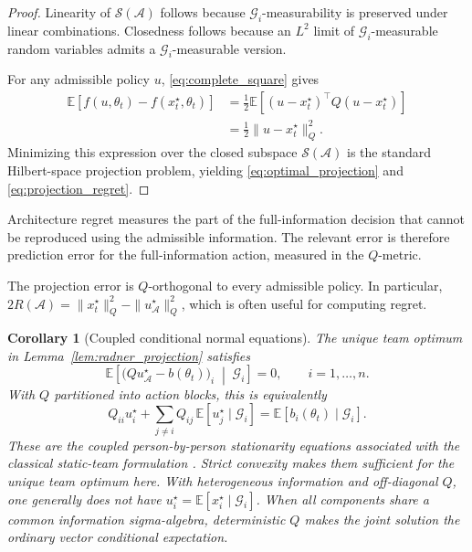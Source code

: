 \documentclass[11pt]{article}
\newtheorem{corollary}{Corollary}
\begin{document}
\begin{proof}
Linearity of $\mathcal{S}(\mathcal{A})$ follows because
$\mathcal{G}_i$-measurability is preserved under linear combinations.
Closedness follows because an $L^2$ limit of
$\mathcal{G}_i$-measurable random variables admits a
$\mathcal{G}_i$-measurable version.

For any admissible policy $u$, \eqref{eq:complete_square} gives
\begin{align}
    \mathbb{E}
    \left[
        f(u,\theta_t)
        -
        f(x_t^\star,\theta_t)
    \right]
    &=
    \frac{1}{2}
    \mathbb{E}
    \left[
        (u-x_t^\star)^\top
        Q
        (u-x_t^\star)
    \right]
    \nonumber\\
    &=
    \frac{1}{2}
    \|u-x_t^\star\|_Q^2.
    \label{eq:projection_proof}
\end{align}
Minimizing this expression over the closed subspace
$\mathcal{S}(\mathcal{A})$ is the standard Hilbert-space projection problem,
yielding \eqref{eq:optimal_projection} and \eqref{eq:projection_regret}.
\end{proof}

Architecture regret measures the part of the full-information decision that
cannot be reproduced using the admissible information. The relevant error is
therefore prediction error for the full-information action, measured in the
$Q$-metric.

The projection error is $Q$-orthogonal to every admissible policy. In particular,
$2R(\mathcal A)=\|x_t^\star\|_Q^2-\|u_{\mathcal A}^\star\|_Q^2$,
which is often useful for computing regret.

\begin{corollary}[Coupled conditional normal equations]
\label{cor:conditional_normal_equations}
The unique team optimum in Lemma~\ref{lem:radner_projection} satisfies
\begin{equation}
    \boxed{
    \mathbb E\!\left[
      \bigl(Q u_{\mathcal A}^{\star}-b(\theta_t)\bigr)_i
      \;\middle|\;
      \mathcal G_i
    \right]
    =0,
    \qquad i=1,\ldots,n.
    }
    \label{eq:conditional_normal_equations}
\end{equation}
With $Q$ partitioned into action blocks, this is equivalently
\begin{equation}
Q_{ii}u_i^\star
+
\sum_{j\ne i}Q_{ij}\,
\mathbb E[u_j^\star\mid\mathcal G_i]
=
\mathbb E[b_i(\theta_t)\mid\mathcal G_i].
\label{eq:block_conditional_normal_equations}
\end{equation}
These are the coupled person-by-person stationarity equations associated with
the classical static-team formulation \cite{radner1962team}. Strict convexity
makes them sufficient for the unique team optimum here. With heterogeneous
information and
off-diagonal $Q$, one generally does not have
$u_i^\star=\mathbb E[x_i^\star\mid\mathcal G_i]$. When all components share a
common information sigma-algebra, deterministic $Q$ makes the joint solution
the ordinary vector conditional expectation.
\end{corollary}
\end{document}
